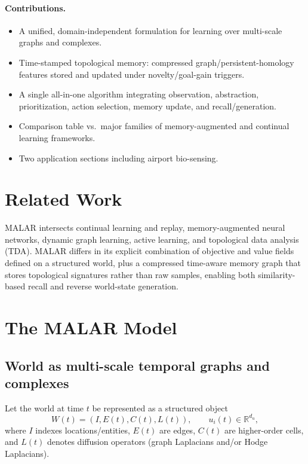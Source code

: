\documentclass[11pt,english]{article}
\theoremstyle{remark}
\begin{document}
\paragraph{Contributions.}
\begin{itemize}[leftmargin=1.3em]
\item A unified, domain-independent formulation for learning over multi-scale graphs and complexes.
\item Time-stamped topological memory: compressed graph/persistent-homology features stored and updated under novelty/goal-gain triggers.
\item A single all-in-one algorithm integrating observation, abstraction, prioritization, action selection, memory update, and recall/generation.
\item Comparison table vs.\ major families of memory-augmented and continual learning frameworks.
\item Two application sections including airport bio-sensing.
\end{itemize}

\section{Related Work}
MALAR intersects continual learning and replay, memory-augmented neural networks, dynamic graph learning,
active learning, and topological data analysis (TDA). MALAR differs in its explicit combination of objective and
value fields defined on a structured world, plus a compressed time-aware memory graph that stores topological
signatures rather than raw samples, enabling both similarity-based recall and reverse world-state generation.

\section{The MALAR Model}
\subsection{World as multi-scale temporal graphs and complexes}
Let the world at time $t$ be represented as a structured object
\begin{equation}
W(t) = (I, E(t), C(t), L(t)), \qquad u_i(t)\in \mathbb{R}^{d_u},
\end{equation}
where $I$ indexes locations/entities, $E(t)$ are edges, $C(t)$ are higher-order cells, and $L(t)$ denotes diffusion operators
(graph Laplacians and/or Hodge Laplacians).
\end{document}
